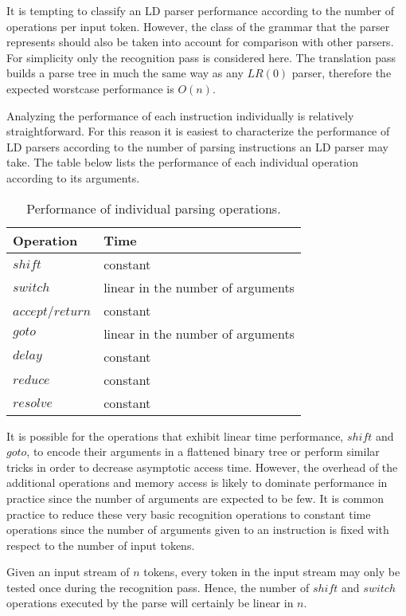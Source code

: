 \documentclass[a4paper,11pt]{article}
\begin{document}
It is tempting to classify an LD parser performance according to the number of operations per input token.
However, the class of the grammar that the parser represents should also be taken into account for comparison with other parsers.
For simplicity only the recognition pass is considered here. 
The translation pass builds a parse tree in much the same way as any $LR(0)$ parser, therefore the expected worstcase performance is $O(n)$.

Analyzing the performance of each instruction individually is relatively straightforward. 
For this reason it is easiest to characterize the performance of LD parsers according to the number of parsing instructions an LD parser may take.
The table below lists the performance of each individual operation according to its arguments.
\clearpage
\begin{table}[!ht]\centering
  \begin{tabular}{|l|l|}
  \hline
  \textbf{Operation} & \textbf{Time} \\
  \hline
  $shi\!ft$          & constant \\ \hline
  $switch$           & linear in the number of arguments \\ \hline
  $accept$/$return$  & constant \\ \hline
  $goto$             & linear in the number of arguments \\ \hline
  $delay$            & constant \\ \hline
  $reduce$           & constant \\ \hline
  $resolve$          & constant \\
  \hline
  \end{tabular}
\caption{Performance of individual parsing operations.}
\end{table}

It is possible for the operations that exhibit linear time performance, $shi\!ft$ and $goto$, to encode their arguments in a flattened binary tree or perform similar tricks in order to decrease asymptotic access time.
However, the overhead of the additional operations and memory access is likely to dominate performance in practice since the number of arguments are expected to be few.
It is common practice to reduce these very basic recognition operations to constant time operations since the number of arguments given to an instruction is fixed with respect to the number of input tokens.

Given an input stream of $n$ tokens, every token in the input stream may only be tested once during the recognition pass.
Hence, the number of $shi\!ft$ and $switch$ operations executed by the parse will certainly be linear in $n$.
\end{document}
